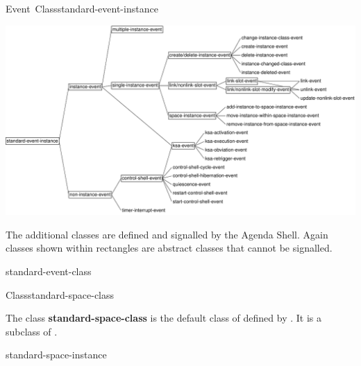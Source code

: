\documentclass[10pt,twoside,english,pdftex]{article}
\begin{document}
\begin{functiondoc}{Event~Class}{standard-event-instance}{}
\T\begin{ifhtml}
\T\end{ifhtml}
\W\begin{iftex} 
\begin{center}
\includegraphics[scale=0.85]{agenda-shell-events}
\end{center}
\W\end{iftex}

\noindent The additional  classes are
defined and signalled by the Agenda Shell.  Again classes shown within
rectangles are abstract classes that cannot be signalled.

\begin{alsos}{standard-event-class}
\end{alsos}

\end{functiondoc}


\begin{functiondoc}{Class}{standard-space-class}{}
%
  
\fnsyntax

\fnpackage {}

\fnmodule {}

\fndescription 
{}%
%
The class \textbf{standard-space-class} is the default class of
 defined by \textbf{}.
It is a subclass of \textbf{}.

\begin{alsos}{standard-space-instance}
\end{alsos}

\end{functiondoc}
\end{document}
